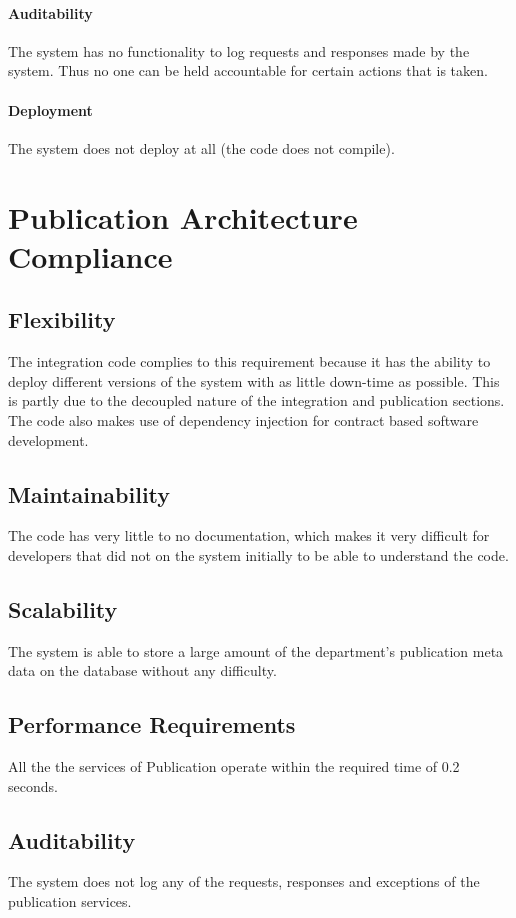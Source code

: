 \documentclass{article}
\begin{document}
            \paragraph{Auditability} The system has no functionality to log requests and responses made by the system. Thus no one can be held accountable for certain actions that is taken.
            \paragraph{Deployment} The system does not deploy at all (the code does not compile).

\section{Publication Architecture Compliance}
    \subsection{Flexibility}
    The integration code complies to this requirement because it has the ability to deploy different versions of the system with as little down-time as possible. This is partly due to the decoupled nature of the integration and publication sections. The code also makes use of dependency injection for contract based software development.
    
    \subsection{Maintainability}
    The code has very little to no documentation, which makes it very difficult for developers that did not on the system initially to be able to understand the code.
    
    \subsection{Scalability}
    The system is able to store a large amount of the department's publication meta data on the database without any difficulty.
    
    \subsection{Performance Requirements}
    All the the services of Publication operate within the required time of 0.2 seconds.
    
    \subsection{Auditability}
    The system does not log any of the requests, responses and exceptions of the publication services.
    
\end{document}
